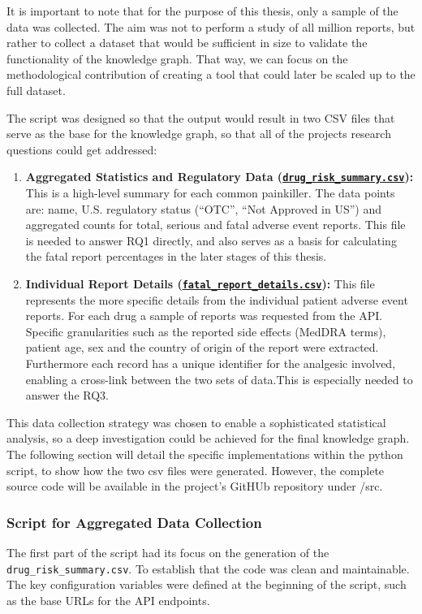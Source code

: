 It is important to note that for the purpose of this thesis, only a sample of the data was collected. The aim was not to perform a study of all million reports, but rather to collect a dataset that would be sufficient in size to validate the functionality of the knowledge graph.  That way, we can focus on the methodological contribution of creating a tool that could later be scaled up to the full dataset. 

The script was designed so that the output would result in two CSV files that serve as the base for the knowledge graph, so that all of the projects research questions could get addressed:

\begin{enumerate}
    \item \textbf{Aggregated Statistics and Regulatory Data (\href{https://github.com/zerdapt/bachelor-thesis/blob/main/data/raw/drug_risk_summary.csv}{\nolinkurl{drug_risk_summary.csv}}):} This is a high-level summary for each common painkiller. The data points are: name, U.S. regulatory status (“OTC”, “Not Approved in US”) and aggregated counts for total, serious and fatal adverse event reports. This file is needed to answer RQ1 directly, and also serves as a basis for calculating the fatal report percentages in the later stages of this thesis.
    \item \textbf{Individual Report Details (\href{https://github.com/zerdapt/bachelor-thesis/blob/main/data/raw/fatal_report_details.csv}{\nolinkurl{fatal_report_details.csv}}):} This file represents the more specific details from the individual patient adverse event reports. For each drug a sample of reports was requested from the API. Specific granularities such as the reported side effects (MedDRA terms), patient age, sex and the country of origin of the report were extracted. Furthermore each record has a unique identifier for the analgesic involved, enabling a cross-link between the two sets of data.This is especially needed to answer the RQ3.
\end{enumerate}
This data collection strategy was chosen to enable a sophisticated statistical analysis, so a deep investigation could be achieved for the final knowledge graph. The following section will detail the specific implementations within the python script, to show how the two csv files were generated. However, the complete source code will be available in the project's GitHUb repository under /src. 
\subsubsection{Script for Aggregated Data Collection}
The first part of the script had its focus on the generation of the \texttt{drug\_risk\_summary.csv}. To establish that the code was clean and maintainable. The key configuration variables were defined at the beginning of the script, such as the base URLs for the API endpoints. 

